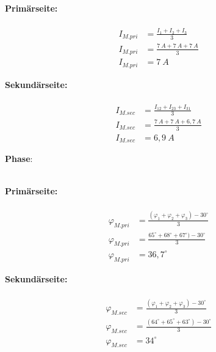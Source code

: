 \begin{enumerate}[label=\alph*)]
\begin{tcolorbox}[colback=gray!30,
			      colframe=black,
			      width=0.9\textwidth,
		      ]
{			      \begin{minipage}{0.5\textwidth}
				      \textbf{Primärseite:}\\ \ \\
				      \begin{align*}
					      I_{M.pri} & = \frac{I_{1} + I_{2} + I_{3}}{3} \\
					      I_{M.pri} & = \frac{7\ A + 7\ A + 7\ A}{3}    \\
					      I_{M.pri} & = 7\ A
				      \end{align*}
			      \end{minipage}\hfill
			      \begin{minipage}{0.5\textwidth}
				      \textbf{Sekundärseite:}\\ \ \\
				      \begin{align*}
					      I_{M.sec} & = \frac{I_{12} + I_{23} + I_{31}}{3} \\
					      I_{M.sec} & = \frac{7\ A + 7\ A + 6,7\ A}{3}     \\
					      I_{M.sec} & = 6,9\ A
				      \end{align*}
			      \end{minipage}
		      }
	      \end{tcolorbox}

	      \textbf{Phase}:\\\ \\
	      \begin{tcolorbox}[colback=gray!30,
			      colframe=black,
			      width=0.9\textwidth,
		      ]
		      \parbox{\textwidth}{

			      \begin{minipage}{0.5\textwidth}
				      \textbf{Primärseite:}\\ \ \\
				      \begin{align*}
					      \varphi_{M.pri} & = \frac{(\varphi_{1} + \varphi_{2} + \varphi_{3})-30^\circ}{3} \\
					      \varphi_{M.pri} & = \frac{65^\circ+68^\circ+67^\circ)-30^\circ}{3}               \\
					      \varphi_{M.pri} & = 36,7^\circ
				      \end{align*}
			      \end{minipage}\hfill
			      \begin{minipage}{0.5\textwidth}
				      \textbf{Sekundärseite:}\\ \ \\
				      \begin{align*}
					      \varphi_{M.sec} & = \frac{(\varphi_{1} + \varphi_{2} + \varphi_{3})-30^\circ}{3} \\
					      \varphi_{M.sec} & = \frac{(64^\circ+65^\circ+63^\circ)-30^\circ}{3}              \\
					      \varphi_{M.sec} & = 34^\circ
				      \end{align*}
			      \end{minipage}
		      }
	      \end{tcolorbox}


\end{enumerate}
